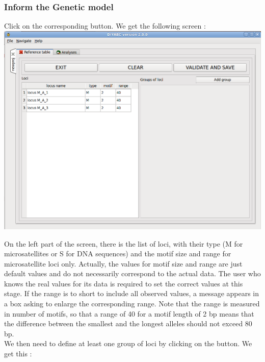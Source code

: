  \newpage
\subsubsection{Inform the Genetic model}

Click on the corresponding  button. We get the following screen : \\

\includegraphics[scale=0.35]{gui_pictures/Capture-DIYABC-15.png} 

On the left part of the screen, there is the list of loci, with their type (M for microsatellites or S for DNA sequences) and the motif size and range for microsatellite loci only. Actually, the values for motif size and range are just default values and do not necessarily correspond to the actual data. The user who knows the real values for its data is required to set the correct values at this stage. If the range is to short to include all observed values, a message appears in a box asking to enlarge the corresponding range. Note that the range is measured in number of motifs, so that a range of 40 for a motif length of 2 bp means that the difference between the smallest and the longest alleles should not exceed 80 bp.\\
We then need to define at least one group of loci by clicking on the  button. We get this :\\

